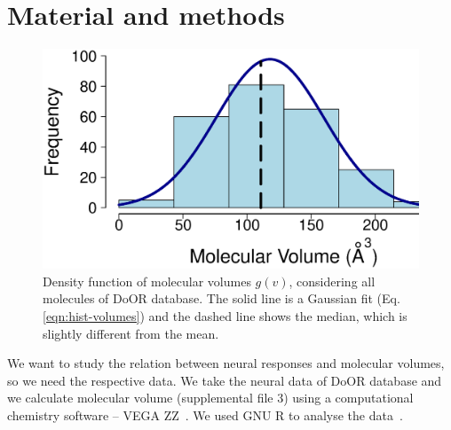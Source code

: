 \documentclass[11pt]{article} %
\begin{document}

 
 

\section*{Material and methods}
\begin{figure}
	\centering
	\includegraphics[width=0.5 \textwidth]{fig/hist-volumes}
	\caption{Density function of molecular volumes $g(v)$, considering all molecules of DoOR database. 
		The solid line is a Gaussian fit (Eq. \ref{eqn:hist-volumes}) and the dashed line shows the median, 
		which is slightly different from  the mean.}
	\label{fig:hist-volumes}
\end{figure}

We want to study the relation between neural responses and molecular volumes, 
so we need the respective data. 
We take the neural data of DoOR database \cite{Galizia2010} and we calculate molecular volume (supplemental file 3) using a computational chemistry software -- VEGA ZZ~\cite{Pedretti2004}. 
We used  GNU R to analyse the data~\cite{Rlanguage}.
\end{document}
